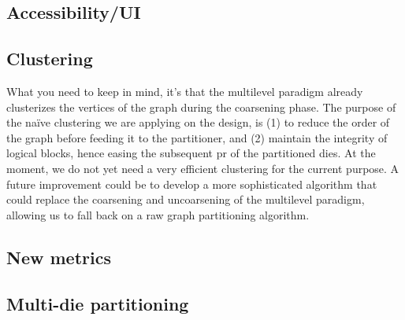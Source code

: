 \documentclass[11pt,a4paper]{article}
\theoremstyle{customdef}
\begin{document}
\subsection{Accessibility/UI}
\subsection{Clustering}
What you need to keep in mind, it's that the multilevel paradigm already clusterizes the vertices of the graph during the coarsening phase.
The purpose of the naïve clustering we are applying on the design, is (1) to reduce the order of the graph before feeding it to the partitioner, and (2) maintain the integrity of logical blocks, hence easing the subsequent \gls{pr} of the partitioned dies.
At the moment, we do not yet need a very efficient clustering for the current purpose.
A future improvement could be to develop a more sophisticated algorithm that could replace the coarsening and uncoarsening of the multilevel paradigm, allowing us to fall back on a raw graph partitioning algorithm.
\subsection{New metrics}
\subsection{Multi-die partitioning}

\clearpage

\newpage

% 

\end{document}
